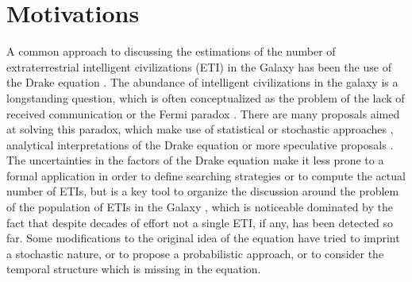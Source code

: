 \documentclass[crop]{CSLB}
\begin{document}




\maketitle


\section{Motivations}\label{S_motivations}

A common approach to discussing the estimations of the number of
extraterrestrial intelligent civilizations (ETI) in the Galaxy has
been the use of the Drake equation \citep{gleiser_drake_2010,
prantzos_joint_2013, haqq-misra_drake_2017}.
%
The abundance of intelligent civilizations in the galaxy is a
longstanding question, which is often conceptualized as the problem of
the lack of received communication or the Fermi paradox
\citep{barlow_galactic_2012, Sotos_biotechnology_2019,
forgan_galactic_2016}.
%
There are many proposals aimed at solving this paradox, which make use
of statistical \citep{solomonides_probabilistic_2016,
vanhouten_isthere_2017, horvat_calculating_2007,
maccone_statistical_2015} or stochastic approaches
\citep{forgan_numerical_2009, bloetscher_using_2019,
glade_stochastic_2011, forgan_numerical_2010}, analytical
interpretations of the Drake equation \citep{prantzos_joint_2013,
smith_broadcasting_2009} or more speculative proposals
\citep{barlow_galactic_2013, lampton_information_2013,
conway_three_2018, forgan_galactic_2017}.
%
The uncertainties in the factors of the Drake equation make it less
prone to a formal application in order to define searching strategies
or to compute the actual number of ETIs, but is a key tool to organize
the discussion around the problem of the population of ETIs in the
Galaxy \citep{hinkel_interdisciplinary_2019}, which is noticeable
dominated by the fact that despite decades of effort not a single ETI,
if any, has been detected so far.
%
Some modifications to the original idea of the equation have tried to
imprint a stochastic nature, or to propose a probabilistic approach,
or to consider the temporal structure which is missing in the
equation.
%
\end{document}
